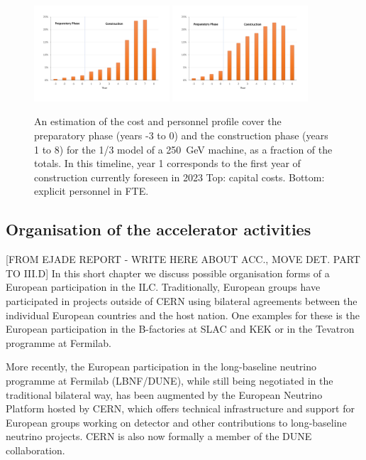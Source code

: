 \documentclass[%
 reprint,
 amsmath,amssymb,
 aps,
]{revtex4-1}
\begin{document}
\begin{figure}[htbp]
\includegraphics[width=0.45\textwidth]{figures/profile-250GeV-MEUR-norm.pdf}
\includegraphics[width=0.45\textwidth]{figures/profile-250GeV-FTE-norm.pdf}
\caption{\label{fig:costprofile:costprofile} An estimation of the cost and personnel profile cover the preparatory phase (years -3 to 0) 
and the construction phase (years 1 to 8) for the 1/3 model of a 250~GeV machine, as a fraction of the
totals. In this timeline, 
year 1 corresponds to the first year of construction currently foreseen in 2023 
Top: capital costs. Bottom: explicit personnel in FTE.
}
\end{figure}


\subsection{\label{sec:acc-org}Organisation of the accelerator activities}
[FROM EJADE REPORT - WRITE HERE ABOUT ACC.,  MOVE DET. PART TO III.D]
In this short chapter we discuss possible organisation forms of a European 
participation in the ILC. Traditionally, European groups have participated in 
projects outside of CERN using bilateral agreements between the individual 
European countries and the host nation. One examples for these is the European 
participation in the B-factories at SLAC and KEK or in the Tevatron programme at 
Fermilab.

More recently, the European participation in the long-baseline neutrino 
programme at Fermilab (LBNF/DUNE), while still being negotiated in the 
traditional bilateral way, has been augmented by the European Neutrino Platform 
hosted by CERN, which offers technical infrastructure and support for European 
groups working on detector and other contributions to long-baseline neutrino 
projects. CERN is also now formally a member of the DUNE collaboration.
\end{document}
